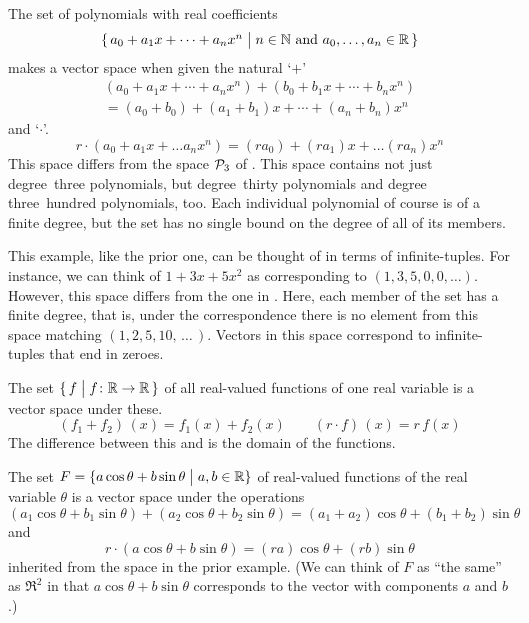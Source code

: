 \begin{example}
The set of polynomials with real coefficients
\begin{equation*}
 \mbox{$\{\, a_0+a_1x+\cdots+a_nx^n\bigm| n\in\mathbb{N}
    \text{ and } a_0,\ldots,a_n\in\mathbb{R}\,\}$} 
\end{equation*}
makes a vector space when given the natural `$+$' 
\begin{multline*}
  (a_0+a_1x+\cdots+a_nx^n)+(b_0+b_1x+\cdots+b_nx^n)  \\
     =(a_0+b_0)+(a_1+b_1)x+\cdots +(a_n+b_n)x^n
\end{multline*}
and `$\cdot$'.
\begin{equation*}
  r\cdot (a_0+a_1x+\ldots a_nx^n)
   =
  (ra_0)+(ra_1)x+\ldots (ra_n)x^n
\end{equation*}
This space differs from the space $\mathcal{P}_3$ of
.
This space contains not just degree~three polynomials, 
but degree~thirty polynomials and
degree three~hundred polynomials, too.
Each individual polynomial of course is of a finite degree, 
but the set has no single bound on the degree of all of its members.

This example, like the prior one,  
can be thought of in terms of infinite-tuples.
For instance, we can think of \( 1+3x+5x^2 \) as corresponding to
\( (1,3,5,0,0,\ldots) \).
However, this space differs from the one in
.
Here, each member of the set has a finite degree, that is,
under the correspondence there is no element from this space 
matching \( (1,2,5,10,\,\ldots\,) \).
Vectors in this space correspond to infinite-tuples
that end in zeroes.
\end{example}

\begin{example}  \label{ex:RealValuedFcns}
The set
\( \mbox{$\{\,f\bigm| \mbox{$f\colon \mathbb{R}\to \mathbb{R}$} \,\}$} \)
of all real-valued functions of one real variable
is a vector space under these.
\begin{equation*}
  (f_1+f_2)\,(x)=f_1(x)+f_2(x)
  \qquad
  (r\cdot f)\,(x)=r\,f(x)
\end{equation*}
The difference between this and  is the
domain of the functions.
\end{example}

\begin{example}\label{ex:ACos+BSin}
The set
\( F=\{ a\cos\theta+b\sin\theta \bigm| a,b\in\mathbb{R}\} \)
of real-valued functions of the real variable \( \theta \)
is a vector space under the operations
\begin{equation*}
  (a_1\cos\theta+b_1\sin\theta)+(a_2\cos\theta+b_2\sin\theta)
    =(a_1+a_2)\cos\theta+(b_1+b_2)\sin\theta
\end{equation*}
and
\begin{equation*}
  r\cdot (a\cos\theta+b\sin\theta)
   =(ra)\cos\theta+(rb)\sin\theta
\end{equation*}
inherited from the space in the prior example.
(We can think of \( F \) as ``the same'' as \( \Re^2 \)
in that $a\cos\theta+b\sin\theta$ corresponds to the vector with
components $a$ and $b$.)
\end{example}

